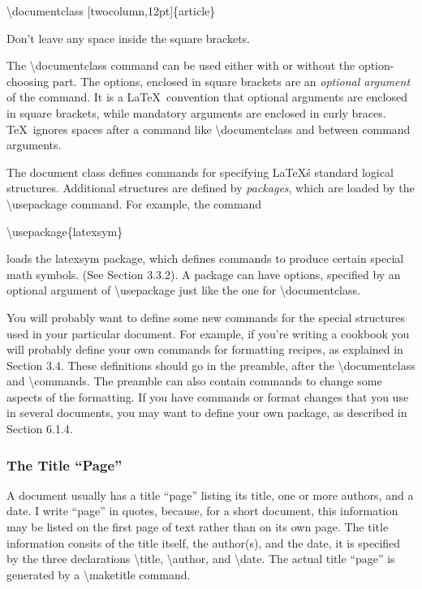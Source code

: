 \documentclass[twocolumn]{article}        %
\begin{document}
\textbackslash documentclass [twocolumn,12pt]\{article\}

Don't leave any space inside the square brackets.

The \textbackslash documentclass command can be used either with or without the option-choosing part.
The options, enclosed in square brackets are an \emph{optional argument} of the command. It is a \LaTeX\ 
convention that optional arguments are enclosed in square brackets, while mandatory arguments are enclosed
in curly braces. \TeX\ ignores spaces after a command like \textbackslash documentclass and 
between command arguments.

The document class defines commands for specifying \LaTeX\'s standard logical structures. Additional structures 
are defined by \emph{packages}, which are loaded by the \textbackslash usepackage command. For example, the command 

\textbackslash usepackage\{latexsym\}

\noindent 
loads the latexsym package, which defines commands to produce certain special math symbols. (See Section 3.3.2).
A package can have options, specified by an optional argument of \textbackslash usepackage just like the one for 
\textbackslash documentclass.

You will probably want to define some new commands for the special structures used in your particular document.
For example, if you're writing a cookbook you will probably define your own commands for formatting recipes, as
explained in Section 3.4. These definitions should go in the preamble, after the \textbackslash documentclass and 
\textbackslash commands. The preamble can also contain commands to change some aspects of the formatting.
If you have commands or format changes that you use in several documents, you may want to define your own package,
as described in Section 6.1.4.

\subsubsection*{The Title ``Page''}

A document usually has a title ``page'' listing its title, one or more authors, and a date. I write ``page'' in quotes, 
because, for a short document, this information may be listed on the first page of text rather than on its own page.
The title information consits of the title itself, the author(s), and the date, it is specified by the three declarations
\textbackslash title, \textbackslash author, and \textbackslash date. The actual title ``page'' is generated by a 
\textbackslash maketitle command.
\end{document}
